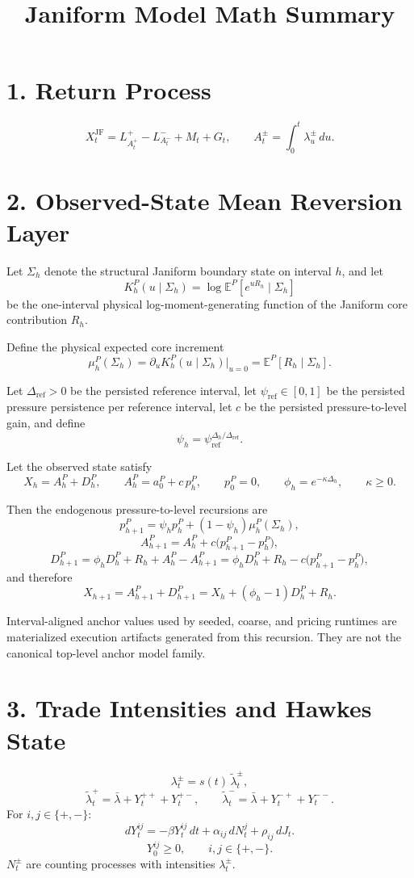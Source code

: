 \documentclass[11pt]{article}
\title{Janiform Model Math Summary}
\author{}
\date{}
\begin{document}
\maketitle

\section*{1. Return Process}
\[
X_t^{\mathrm{JF}} = L^+_{A_t^+} - L^-_{A_t^-} + M_t + G_t,
\qquad
A_t^\pm = \int_0^t \lambda_u^\pm\,du.
\]

\section*{2. Observed-State Mean Reversion Layer}
Let \(\Sigma_h\) denote the structural Janiform boundary state on interval \(h\), and let
\[
K_h^P(u \mid \Sigma_h)
=
\log \mathbb E^P[e^{u R_h}\mid \Sigma_h]
\]
be the one-interval physical log-moment-generating function of the Janiform core contribution \(R_h\).

Define the physical expected core increment
\[
\mu_h^P(\Sigma_h)
=
\partial_u K_h^P(u \mid \Sigma_h)\big|_{u=0}
=
\mathbb E^P[R_h \mid \Sigma_h].
\]

Let \(\Delta_{\mathrm{ref}} > 0\) be the persisted reference interval, let
\(\psi_{\mathrm{ref}} \in [0,1]\) be the persisted pressure persistence per
reference interval, let \(c\) be the persisted pressure-to-level gain, and
define
\[
\psi_h = \psi_{\mathrm{ref}}^{\Delta_h / \Delta_{\mathrm{ref}}}.
\]

Let the observed state satisfy
\[
X_h = A_h^P + D_h^P,
\qquad
A_h^P = a_0^P + c\,p_h^P,
\qquad
p_0^P = 0,
\qquad
\phi_h=e^{-\kappa \Delta_h},
\qquad
\kappa \ge 0.
\]

Then the endogenous pressure-to-level recursions are
\[
p_{h+1}^P = \psi_h p_h^P + (1-\psi_h)\mu_h^P(\Sigma_h),
\]
\[
A_{h+1}^P = A_h^P + c\big(p_{h+1}^P - p_h^P\big),
\]
\[
D_{h+1}^P
=
\phi_h D_h^P + R_h + A_h^P - A_{h+1}^P
=
\phi_h D_h^P + R_h - c\big(p_{h+1}^P - p_h^P\big),
\]
and therefore
\[
X_{h+1}
=
A_{h+1}^P + D_{h+1}^P
=
X_h + (\phi_h - 1)D_h^P + R_h.
\]

Interval-aligned anchor values used by seeded, coarse, and pricing runtimes are
materialized execution artifacts generated from this recursion. They are not the
canonical top-level anchor model family.

\section*{3. Trade Intensities and Hawkes State}
\[
\lambda_t^\pm = s(t)\,\tilde{\lambda}_t^\pm,
\]
\[
\tilde{\lambda}_t^+ = \bar{\lambda} + Y_t^{++} + Y_t^{+-},
\qquad
\tilde{\lambda}_t^- = \bar{\lambda} + Y_t^{-+} + Y_t^{--}.
\]
For \(i,j\in\{+,-\}\):
\[
dY_t^{ij} = -\beta Y_t^{ij}\,dt + \alpha_{ij}\,dN_t^{j} + \rho_{ij}\,dJ_t.
\]
\[
Y_0^{ij}\ge 0,\qquad i,j\in\{+,-\}.
\]
\(N_t^\pm\) are counting processes with intensities \(\lambda_t^\pm\).
\end{document}
